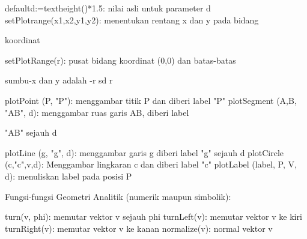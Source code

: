 \documentclass[a4paper,10pt]{article}
\begin{document}
\begin{eulernotebook}
\begin{eulercomment}
\begin{eulercomment}
\begin{eulercomment}
\begin{eulercomment}
\begin{eulercomment}
\begin{eulercomment}
\begin{eulercomment}
\begin{eulercomment}
\begin{eulercomment}
\begin{eulercomment}
\begin{eulercomment}
\begin{eulercomment}
\begin{eulercomment}
\begin{eulercomment}
\begin{eulercomment}
\begin{eulercomment}
\begin{eulercomment}
\begin{eulercomment}
\begin{eulercomment}
\begin{eulercomment}
\begin{eulercomment}
\begin{eulercomment}
\begin{eulercomment}
\begin{eulercomment}
\begin{eulercomment}
\begin{eulercomment}
\begin{eulercomment}
\begin{eulercomment}
\begin{eulercomment}
\begin{eulercomment}
\begin{eulercomment}
\begin{eulercomment}
\begin{eulercomment}
\begin{eulercomment}
\begin{eulercomment}
\begin{eulercomment}
\begin{eulercomment}
\begin{eulercomment}
\begin{eulercomment}
\begin{eulercomment}
\begin{eulercomment}
\begin{eulercomment}
\begin{eulercomment}
\begin{eulercomment}
\begin{eulercomment}
\begin{eulercomment}
\begin{eulercomment}
\begin{eulercomment}
\begin{eulercomment}
\begin{eulercomment}
\begin{eulercomment}
\begin{eulercomment}
\begin{eulercomment}
\begin{eulercomment}
\begin{eulercomment}
\begin{eulercomment}
\begin{eulercomment}
\begin{eulercomment}
\begin{eulercomment}
\begin{eulercomment}
\begin{eulercomment}
\begin{eulercomment}
\begin{eulerttcomment}
defaultd:=textheight()*1.5: nilai asli untuk parameter d
  setPlotrange(x1,x2,y1,y2): menentukan rentang x dan y pada bidang
\end{eulerttcomment}
\begin{eulercomment}
koordinat\\
\end{eulercomment}
\begin{eulerttcomment}
  setPlotRange(r): pusat bidang koordinat (0,0) dan batas-batas
\end{eulerttcomment}
\begin{eulercomment}
sumbu-x dan y adalah -r sd r\\
\end{eulercomment}
\begin{eulerttcomment}
  plotPoint (P, "P"): menggambar titik P dan diberi label "P"
  plotSegment (A,B, "AB", d): menggambar ruas garis AB, diberi label
\end{eulerttcomment}
\begin{eulercomment}
"AB" sejauh d\\
\end{eulercomment}
\begin{eulerttcomment}
  plotLine (g, "g", d): menggambar garis g diberi label "g" sejauh d
  plotCircle (c,"c",v,d): Menggambar lingkaran c dan diberi label "c"
  plotLabel (label, P, V, d): menuliskan label pada posisi P
\end{eulerttcomment}
\begin{eulercomment}

Fungsi-fungsi Geometri Analitik (numerik maupun simbolik):

\end{eulercomment}
\begin{eulerttcomment}
  turn(v, phi): memutar vektor v sejauh phi
  turnLeft(v):   memutar vektor v ke kiri
  turnRight(v):  memutar vektor v ke kanan
  normalize(v): normal vektor v
  
\end{eulerttcomment}
\end{eulercomment}
\end{eulercomment}
\end{eulercomment}
\end{eulercomment}
\end{eulercomment}
\end{eulercomment}
\end{eulercomment}
\end{eulercomment}
\end{eulercomment}
\end{eulercomment}
\end{eulercomment}
\end{eulercomment}
\end{eulercomment}
\end{eulercomment}
\end{eulercomment}
\end{eulercomment}
\end{eulercomment}
\end{eulercomment}
\end{eulercomment}
\end{eulercomment}
\end{eulercomment}
\end{eulercomment}
\end{eulercomment}
\end{eulercomment}
\end{eulercomment}
\end{eulercomment}
\end{eulercomment}
\end{eulercomment}
\end{eulercomment}
\end{eulercomment}
\end{eulercomment}
\end{eulercomment}
\end{eulercomment}
\end{eulercomment}
\end{eulercomment}
\end{eulercomment}
\end{eulercomment}
\end{eulercomment}
\end{eulercomment}
\end{eulercomment}
\end{eulercomment}
\end{eulercomment}
\end{eulercomment}
\end{eulercomment}
\end{eulercomment}
\end{eulercomment}
\end{eulercomment}
\end{eulercomment}
\end{eulercomment}
\end{eulercomment}
\end{eulercomment}
\end{eulercomment}
\end{eulercomment}
\end{eulercomment}
\end{eulercomment}
\end{eulercomment}
\end{eulercomment}
\end{eulercomment}
\end{eulercomment}
\end{eulercomment}
\end{eulercomment}
\end{eulercomment}
\end{eulernotebook}
\end{document}
